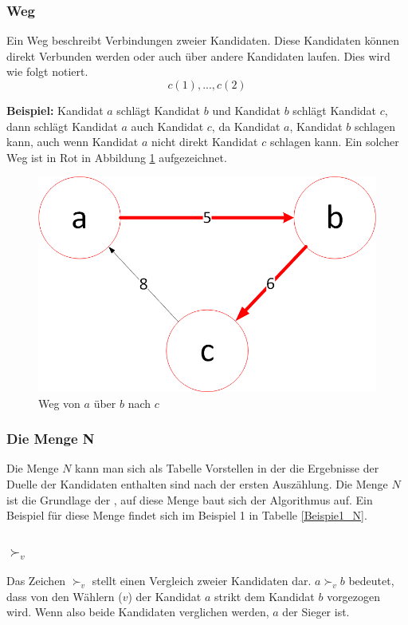 \newpage
\subsubsection{Weg}
\label{weg}
Ein Weg beschreibt Verbindungen zweier Kandidaten. Diese Kandidaten können direkt Verbunden werden oder auch über andere Kandidaten laufen. Dies wird wie folgt notiert.
\[
c(1),...,c(2)
\]

\textbf{Beispiel:} Kandidat $a$ schlägt Kandidat $b$ und Kandidat $b$ schlägt Kandidat $c$, dann schlägt Kandidat $a$ auch Kandidat $c$, da Kandidat $a$, Kandidat $b$ schlagen kann, auch wenn Kandidat $a$ nicht direkt Kandidat $c$ schlagen kann. Ein solcher Weg ist in Rot in Abbildung \ref{fig:weg} aufgezeichnet. 

\begin{figure}[!h]
\centering
\includegraphics[scale=0.5]{Bilder/Weg.png}
\caption{Weg von $a$ über $b$ nach $c$}
\label{fig:weg}
\end{figure}

\subsubsection{Die Menge N}
\label{mengeN}
Die Menge $N$ kann man sich als Tabelle Vorstellen in der die Ergebnisse der Duelle der Kandidaten enthalten sind nach der ersten Auszählung. Die Menge $N$ ist die Grundlage der \schulze , auf diese Menge baut sich der Algorithmus auf. Ein Beispiel für diese Menge findet sich im Beispiel 1 in Tabelle \ref{Beispie1_N}.

\subsubsection{$\succ_{v}$}
\label{vv}
Das Zeichen $\succ_{v}$ stellt einen Vergleich zweier Kandidaten dar. $a \succ_{v}{ } b$ bedeutet, dass von den Wählern ($v$) der Kandidat $a$ strikt dem Kandidat $b$ vorgezogen wird. Wenn also beide Kandidaten verglichen werden, $a$ der Sieger ist.

